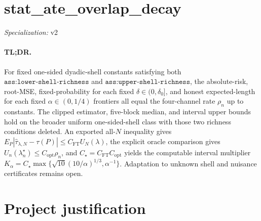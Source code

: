 \documentclass{article}
\begin{document}
\sloppy

\section*{stat\_\allowbreak{}ate\_\allowbreak{}overlap\_\allowbreak{}decay}

\noindent\textit{Specialization:} v2\par

\paragraph{TL;DR.} For fixed one-sided dyadic-shell constants satisfying both \(\texttt{ass:lower-shell-richness}\) and \(\texttt{ass:upper-shell-richness}\), the absolute-risk, root-MSE, fixed-probability for each fixed \(\delta\in(0,\delta_0]\), and honest expected-length for each fixed \(\alpha\in(0,1/4)\) frontiers all equal the four-channel rate \(\rho_n\) up to constants.  The clipped estimator, five-block median, and interval upper bounds hold on the broader uniform one-sided-shell class with those two richness conditions deleted.  An exported all-\(N\) inequality gives \(E_P|\widehat\tau_{\lambda,N}-\tau(P)|\leq C_{\mathrm{FT}}U_N(\lambda)\), the explicit oracle comparison gives \(U_n(\lambda_n^\star)\leq C_{\mathrm{opt}}\rho_n\), and \(C_\star=C_{\mathrm{FT}}C_{\mathrm{opt}}\) yields the computable interval multiplier \(K_\alpha=C_\star\max\{\sqrt{10}(10/\alpha)^{1/3},\alpha^{-1}\}\).  Adaptation to unknown shell and nuisance certificates remains open.

\section{Project justification}
\end{document}
